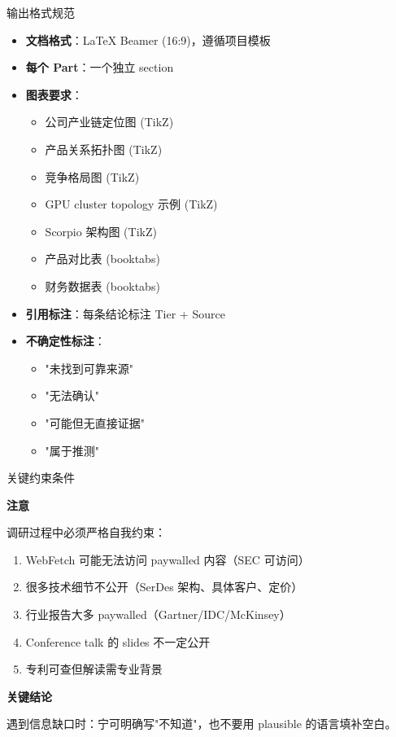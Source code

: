 \documentclass[UTF8,11pt,aspectratio=169]{beamer}
\newenvironment{keypoint}{
    \begin{block}{\textbf{\twemoji{key} 关键结论}}
}{
    \end{block}
}
\newenvironment{warningblock}{
    \begin{alertblock}{\textbf{\twemoji{warning} 注意}}
}{
    \end{alertblock}
}
\begin{document}
\begin{frame}{输出格式规范}
    \begin{itemize}
        \item \textbf{文档格式}：LaTeX Beamer (16:9)，遵循项目模板
        \item \textbf{每个 Part}：一个独立 section
        \item \textbf{图表要求}：
            \begin{itemize}
                \item 公司产业链定位图 (TikZ)
                \item 产品关系拓扑图 (TikZ)
                \item 竞争格局图 (TikZ)
                \item GPU cluster topology 示例 (TikZ)
                \item Scorpio 架构图 (TikZ)
                \item 产品对比表 (booktabs)
                \item 财务数据表 (booktabs)
            \end{itemize}
        \item \textbf{引用标注}：每条结论标注 Tier + Source
        \item \textbf{不确定性标注}：
            \begin{itemize}
                \item "未找到可靠来源"
                \item "无法确认"
                \item "可能但无直接证据"
                \item "属于推测"
            \end{itemize}
    \end{itemize}
\end{frame}

\begin{frame}{关键约束条件}
    \begin{warningblock}
        调研过程中必须严格自我约束：
        \begin{enumerate}
            \item WebFetch 可能无法访问 paywalled 内容（SEC 可访问）
            \item 很多技术细节不公开（SerDes 架构、具体客户、定价）
            \item 行业报告大多 paywalled（Gartner/IDC/McKinsey）
            \item Conference talk 的 slides 不一定公开
            \item 专利可查但解读需专业背景
        \end{enumerate}
    \end{warningblock}

    \begin{keypoint}
        遇到信息缺口时：\alert{宁可明确写"不知道"}，也不要用 plausible 的语言填补空白。
    \end{keypoint}
\end{frame}
\end{document}
